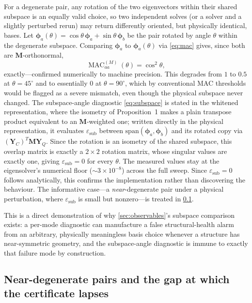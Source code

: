 \documentclass{ieeeaccess}
\newcommand{\M}{\mathbf{M}}
\newcommand{\ph}{\boldsymbol{\phi}}
\newcommand{\MAC}{\operatorname{MAC}}
\begin{document}
For a degenerate pair, any rotation of the two eigenvectors within their shared subspace is an equally valid choice, so two independent solves (or a solver and a slightly perturbed rerun) may return differently oriented, but physically identical, bases. Let $\ph_a(\theta)=\cos\theta\,\ph_a+\sin\theta\,\ph_b$ be the pair rotated by angle $\theta$ within the degenerate subspace. Comparing $\ph_a$ to $\ph_a(\theta)$ via \cref{eq:mac} gives, since both are $\M$-orthonormal,
\begin{equation}
\MAC_{aa}^{(M)}(\theta)=\cos^2\theta,
\label{eq:macrotation}
\end{equation}
exactly---confirmed numerically to machine precision. This degrades from $1$ to $0.5$ at $\theta=45^\circ$ and to essentially $0$ at $\theta=90^\circ$, which by conventional MAC thresholds would be flagged as a severe mismatch, even though the physical subspace never changed. The subspace-angle diagnostic \cref{eq:subspace} is stated in the whitened representation, where the isometry of Proposition~1 makes a plain transpose product equivalent to an $\M$-weighted one; written directly in the physical representation, it evaluates $\varepsilon_{\mathrm{sub}}$ between $\mathrm{span}(\ph_a,\ph_b)$ and its rotated copy via $(\mathbf Y_C)^T\M\mathbf Y_Q$. Since the rotation is an isometry of the shared subspace, this overlap matrix is exactly a $2\times2$ rotation matrix, whose singular values are exactly one, giving $\varepsilon_{\mathrm{sub}}=0$ for every $\theta$. The measured values stay at the eigensolver's numerical floor ($\sim\!3\times10^{-8}$) across the full sweep. Since $\varepsilon_{\mathrm{sub}}=0$ follows analytically, this confirms the implementation rather than discovering the behaviour. The informative case---a \emph{near}-degenerate pair under a physical perturbation, where $\varepsilon_{\mathrm{sub}}$ is small but nonzero---is treated in \cref{sec:neardegenerate}.


This is a direct demonstration of why \cref{sec:observables}'s subspace comparison exists: a per-mode diagnostic can manufacture a false structural-health alarm from an arbitrary, physically meaningless basis choice whenever a structure has near-symmetric geometry, and the subspace-angle diagnostic is immune to exactly that failure mode by construction.

\subsection{Near-degenerate pairs and the gap at which the certificate lapses}
\label{sec:neardegenerate}
\end{document}
